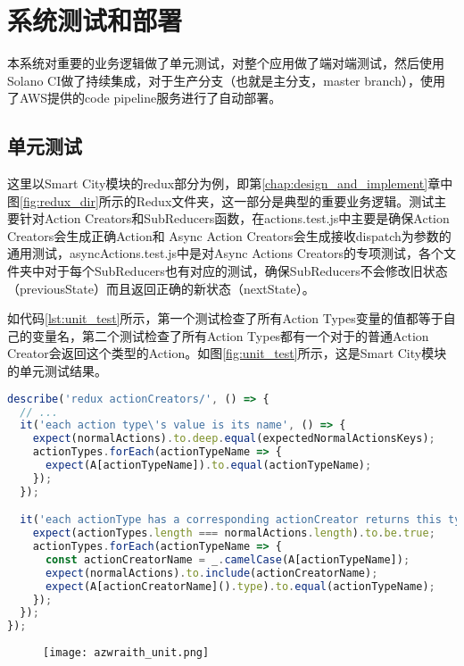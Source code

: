 
\chapter{系统测试和部署}
\label{chap:test_and_deploy}
本系统对重要的业务逻辑做了单元测试，对整个应用做了端对端测试，然后使用Solano CI做了持续集成，对于生产分支（也就是主分支，master branch），使用了AWS提供的code pipeline服务进行了自动部署。
\section{单元测试}
这里以Smart City模块的redux部分为例，即第\ref{chap:design_and_implement}章中图\ref{fig:redux_dir}所示的Redux文件夹，这一部分是典型的重要业务逻辑。测试主要针对Action Creators和SubReducers函数，在actions.test.js中主要是确保Action Creators会生成正确Action和 Async Action Creators会生成接收dispatch为参数的通用测试，asyncActions.test.js中是对Async Actions Creators的专项测试，各个文件夹中对于每个SubReducers也有对应的测试，确保SubReducers不会修改旧状态（previousState）而且返回正确的新状态（nextState）。

如代码\ref{lst:unit_test}所示，第一个测试检查了所有Action Types变量的值都等于自己的变量名，第二个测试检查了所有Action Types都有一个对于的普通Action Creator会返回这个类型的Action。如图\ref{fig:unit_test}所示，这是Smart City模块的单元测试结果。
\begin{lstlisting}[language={JavaScript}, label={lst:unit_test}, caption={单元测试样例代码}]
describe('redux actionCreators/', () => {
  // ...
  it('each action type\'s value is its name', () => {
    expect(normalActions).to.deep.equal(expectedNormalActionsKeys);
    actionTypes.forEach(actionTypeName => {
      expect(A[actionTypeName]).to.equal(actionTypeName);
    });
  });

  it('each actionType has a corresponding actionCreator returns this type of action', () => {
    expect(actionTypes.length === normalActions.length).to.be.true;
    actionTypes.forEach(actionTypeName => {
      const actionCreatorName = _.camelCase(A[actionTypeName]);
      expect(normalActions).to.include(actionCreatorName);
      expect(A[actionCreatorName]().type).to.equal(actionTypeName);
    });
  });
});
\end{lstlisting}

\begin{figure}[H]
 \centering
 \texttt{[image: azwraith\_unit.png]}
\end{figure}
